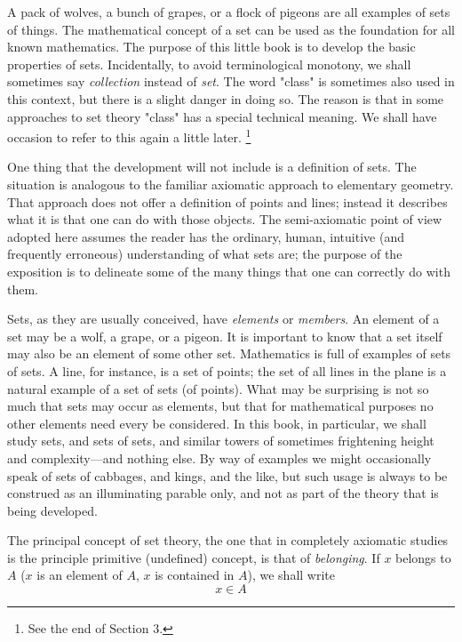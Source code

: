   A pack of wolves, a bunch of grapes, or a flock of pigeons are all examples of sets of things. 
 The mathematical concept of a set can be used as the foundation for all known mathematics. 
 The purpose of this little book is to develop the basic properties of sets. 
 Incidentally, to avoid terminological monotony, we shall sometimes say \textit{collection} instead of \textit{set}. 
 The word "class" is sometimes also used in this context, but there is a slight danger in doing so. 
 The reason is that in some approaches to set theory "class" has a special technical meaning. 
 We shall have occasion to refer to this again a little later. 
   \footnote{
     See the end of Section 3. 
   }


 One thing that the development will not include is a definition of sets. 
 The situation is analogous to the familiar axiomatic approach to elementary geometry. 
 That approach does not offer a definition of points and lines; instead it describes what it is that one can do with those objects. 
 The semi-axiomatic point of view adopted here assumes the reader has the ordinary, human, intuitive (and frequently erroneous) understanding of what sets are; the purpose of the exposition is to delineate some of the many things that one can correctly do with them.


  Sets, as they are usually conceived, have \textit{elements} or \textit{members}. 
 An element of a set may be a wolf, a grape, or a pigeon. 
 It is important to know that a set itself may also be an element of some other set. 
 Mathematics is full of examples of sets of sets. 
 A line, for instance, is a set of points; the set of all lines in the plane is a natural example of a set of sets (of points). 
 What may be surprising is not so much that sets may occur as elements, but that for mathematical purposes no other elements need every be considered. 
 In this book, in particular, we shall study sets, and sets of sets, and similar towers of sometimes frightening height and complexity---and nothing else. 
 By way of examples we might occasionally speak of sets of cabbages, and kings, and the like, but such usage is always to be construed as an illuminating parable only, and not as part of the theory that is being developed.


  The principal concept of set theory, the one that in completely axiomatic studies is the principle primitive (undefined) concept, is that of \textit{belonging}. 
 If $x$ belongs to $A$ ($x$ is an element of $A$, $x$ is contained in $A$), we shall write  
     \[ x \in A \]
       
